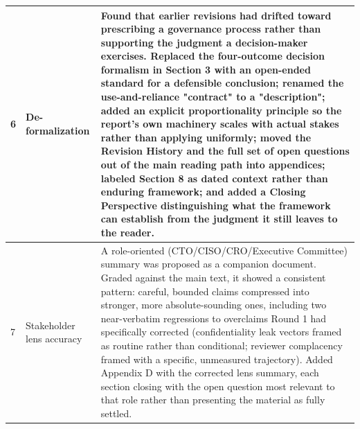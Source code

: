 \begin{center}
\begin{tabular}{|p{}|p{}|>{\small\raggedright\arraybackslash}p{}|}
\hline
6 & De-formalization & Found that earlier revisions had drifted toward prescribing a governance process rather than supporting the judgment a decision-maker exercises. Replaced the four-outcome decision formalism in Section 3 with an open-ended standard for a defensible conclusion; renamed the use-and-reliance "contract" to a "description"; added an explicit proportionality principle so the report's own machinery scales with actual stakes rather than applying uniformly; moved the Revision History and the full set of open questions out of the main reading path into appendices; labeled Section 8 as dated context rather than enduring framework; and added a Closing Perspective distinguishing what the framework can establish from the judgment it still leaves to the reader. \\
\hline
7 & Stakeholder lens accuracy & A role-oriented (CTO/CISO/CRO/Executive Committee) summary was proposed as a companion document. Graded against the main text, it showed a consistent pattern: careful, bounded claims compressed into stronger, more absolute-sounding ones, including two near-verbatim regressions to overclaims Round 1 had specifically corrected (confidentiality leak vectors framed as routine rather than conditional; reviewer complacency framed with a specific, unmeasured trajectory). Added Appendix D with the corrected lens summary, each section closing with the open question most relevant to that role rather than presenting the material as fully settled. \\
\hline
\end{tabular}
\end{center}
